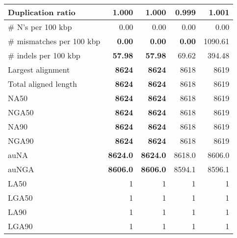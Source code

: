 \documentclass[12pt,a4paper]{article}
\begin{document}
\begin{table}[ht]
\begin{center}
\begin{tabular}{|l*{4}{|r}|}
Duplication ratio & 1.000 & 1.000 & {\bf 0.999} & 1.001 \\ \hline
\# N's per 100 kbp & 0.00 & 0.00 & 0.00 & 0.00 \\ \hline
\# mismatches per 100 kbp & {\bf 0.00} & {\bf 0.00} & {\bf 0.00} & 1090.61 \\ \hline
\# indels per 100 kbp & {\bf 57.98} & {\bf 57.98} & 69.62 & 394.48 \\ \hline
Largest alignment & {\bf 8624} & {\bf 8624} & 8618 & 8619 \\ \hline
Total aligned length & {\bf 8624} & {\bf 8624} & 8618 & 8619 \\ \hline
NA50 & {\bf 8624} & {\bf 8624} & 8618 & 8619 \\ \hline
NGA50 & {\bf 8624} & {\bf 8624} & 8618 & 8619 \\ \hline
NA90 & {\bf 8624} & {\bf 8624} & 8618 & 8619 \\ \hline
NGA90 & {\bf 8624} & {\bf 8624} & 8618 & 8619 \\ \hline
auNA & {\bf 8624.0} & {\bf 8624.0} & 8618.0 & 8606.0 \\ \hline
auNGA & {\bf 8606.0} & {\bf 8606.0} & 8594.1 & 8596.1 \\ \hline
LA50 & 1 & 1 & 1 & 1 \\ \hline
LGA50 & 1 & 1 & 1 & 1 \\ \hline
LA90 & 1 & 1 & 1 & 1 \\ \hline
LGA90 & 1 & 1 & 1 & 1 \\ \hline
\end{tabular}
\end{center}
\end{table}
\end{document}
